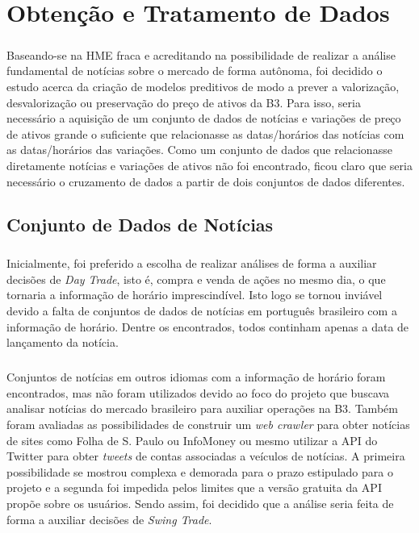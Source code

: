 \documentclass[grad,numbers]{coppe}
\begin{document}
  \chapter{Obtenção e Tratamento de Dados}
  	\paragraph{}Baseando-se na HME fraca e acreditando na possibilidade de realizar a análise fundamental de notícias sobre o mercado de forma autônoma, foi decidido o estudo acerca da criação de modelos preditivos de modo a prever a valorização, desvalorização ou preservação do preço de ativos da B3. Para isso, seria necessário a aquisição de um conjunto de dados de notícias e variações de preço de ativos grande o suficiente que relacionasse as datas/horários das notícias com as datas/horários das variações. Como um conjunto de dados que relacionasse diretamente notícias e variações de ativos não foi encontrado, ficou claro que seria necessário o cruzamento de dados a partir de dois conjuntos de dados diferentes.
  	\section{Conjunto de Dados de Notícias}
	  	\paragraph{}Inicialmente, foi preferido a escolha de realizar análises de forma a auxiliar decisões de \textit{Day Trade}, isto é, compra e venda de ações no mesmo dia, o que tornaria a informação de horário imprescindível. Isto logo se tornou inviável devido a falta de conjuntos de dados de notícias em português brasileiro com a informação de horário. Dentre os encontrados, todos continham apenas a data de lançamento da notícia.
	  	\paragraph{}Conjuntos de notícias em outros idiomas com a informação de horário foram encontrados, mas não foram utilizados devido ao foco do projeto que buscava analisar notícias do mercado brasileiro para auxiliar operações na B3. Também foram avaliadas as possibilidades de construir um \textit{web crawler} para obter notícias de sites como Folha de S. Paulo\cite{folha} ou InfoMoney\cite{infomoney} ou mesmo utilizar a API do Twitter\cite{twitter-api} para obter \textit{tweets} de contas associadas a veículos de notícias. A primeira possibilidade se mostrou complexa e demorada para o prazo estipulado para o projeto e a segunda foi impedida pelos limites que a versão gratuita da API propõe sobre os usuários. Sendo assim, foi decidido que a análise seria feita de forma a auxiliar decisões de \textit{Swing Trade}.
\end{document}
